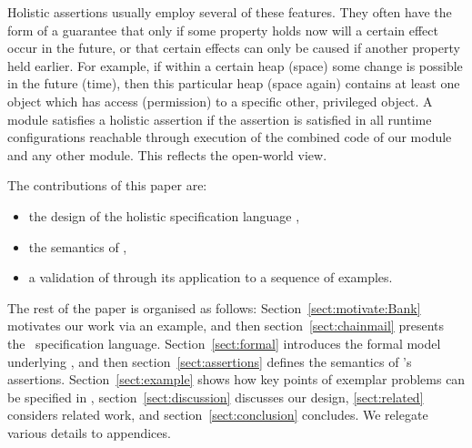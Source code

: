 Holistic assertions usually employ several of these features. They often have the form  of a guarantee
that only if some property holds now will a certain effect occur in the future, or that
certain effects can only be caused if another property held earlier.
For example, if within a certain heap (space) some change is possible in the future (time), then this particular heap 
(space again) contains 
at least one object which has access (permission) to a specific other, privileged object.
A module satisfies a holistic assertion if  
 the assertion is satisfied  in all runtime configurations reachable through execution of the combined code of our module and any other module.
  This reflects the open-world view.


The contributions of this paper are:
\begin{itemize}
\item the design of the holistic specification language \Chainmail,
\item the semantics of \Chainmail,
\item a validation of \Chainmail through its application to a sequence of examples.
\end{itemize}  
  
  
The rest of the paper is organised as follows: Section~\ref{sect:motivate:Bank} 
motivates our work via an example, and then
section~\ref{sect:chainmail} presents the \Chainmail\ specification
language.  Section~\ref{sect:formal} introduces the formal model
underlying \Chainmail, and then section~\ref{sect:assertions} defines
the 
semantics of \Chainmail's assertions.
Section~\ref{sect:example} shows how key points of 
exemplar problems can be specified in \Chainmail,
section~\ref{sect:discussion}
discusses our design, \ref{sect:related} considers related
work, and section~\ref{sect:conclusion} concludes.
We relegate various details to appendices.
